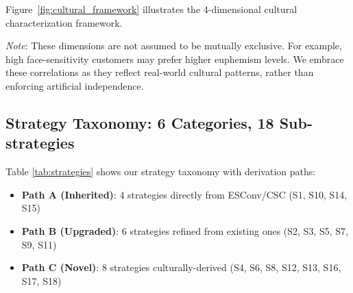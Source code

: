 \documentclass[11pt]{article}
\begin{document}
Figure~\ref{fig:cultural_framework} illustrates the 4-dimensional cultural characterization framework.



\textit{Note}: These dimensions are not assumed to be mutually exclusive. For example, high face-sensitivity customers may prefer higher euphemism levels. We embrace these correlations as they reflect real-world cultural patterns, rather than enforcing artificial independence.

\subsection{Strategy Taxonomy: 6 Categories, 18 Sub-strategies}

Table \ref{tab:strategies} shows our strategy taxonomy with derivation paths:
\begin{itemize}
  \item \textbf{Path A (Inherited)}: 4 strategies directly from ESConv/CSC (S1, S10, S14, S15)
  \item \textbf{Path B (Upgraded)}: 6 strategies refined from existing ones (S2, S3, S5, S7, S9, S11)
  \item \textbf{Path C (Novel)}: 8 strategies culturally-derived (S4, S6, S8, S12, S13, S16, S17, S18)
\end{itemize}
\end{document}
